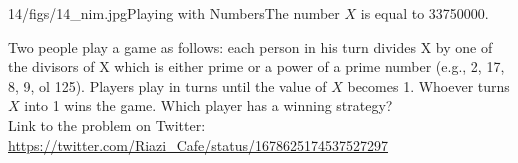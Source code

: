 \begin{problem}{14/figs/14_nim.jpg}{Playing with Numbers}The number $X$ is equal to 33750000.

Two people play a game as follows: each person in his turn divides X by one of the divisors of X which is either prime or a power of a prime number (e.g., 2, 17, 8, 9, ol 125). Players play in turns until the value of $X$ becomes 1. Whoever turns $X$ into 1 wins the game. Which player has a winning strategy? \\[0.2cm]

Link to the problem on Twitter:  \url{https://twitter.com/Riazi_Cafe/status/1678625174537527297}\end{problem}